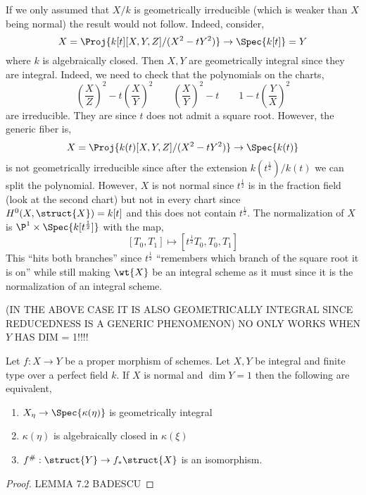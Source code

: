\documentclass[12pt]{article}
\begin{document}
\begin{rmk}
If we only assumed that $X / k$ is geometrically irreducible (which is weaker than $X$ being normal) the result would not follow. Indeed, consider,
\[ X = \Proj{k[t][X,Y,Z]/(X^2 - t Y^2)} \to \Spec{k[t]} = Y \]
where $k$ is algebraically closed. Then $X, Y$ are geometrically integral since they are integral. Indeed, we need to check that the polynomials on the charts,
\[ \left( \frac{X}{Z} \right)^2 - t \left( \frac{X}{Y} \right)^2 \quad \quad \left( \frac{X}{Y} \right)^2 - t \quad \quad 1 - t \left( \frac{Y}{X} \right)^2 \]
are irreducible. They are since $t$ does not admit a square root. However, the generic fiber is,
\[ X = \Proj{k(t)[X,Y,Z]/(X^2 - t Y^2)} \to \Spec{k(t)} \]
is not geometrically irreducible since after the extension $k(t^{\frac{1}{2}}) / k(t)$ we can split the polynomial. However, $X$ is not normal since $t^{\frac{1}{2}}$ is in the fraction field (look at the second chart) but not in every chart since $H^0(X, \struct{X}) = k[t]$ and this does not contain $t^{\frac{1}{2}}$. The normalization of $X$ is $\P^1 \times \Spec{k[t^{\frac{1}{2}}]}$ with the map,
\[ [T_0, T_1] \mapsto [t^{\frac{1}{2}} T_0, T_0, T_1] \]
This ``hits both branches'' since $t^{\frac{1}{2}}$ ``remembers which branch of the square root it is on'' while still making $\wt{X}$ be an integral scheme as it must since it is the normalization of an integral scheme.
\end{rmk}


(IN THE ABOVE CASE IT IS ALSO GEOMETRICALLY INTEGRAL SINCE REDUCEDNESS IS A GENERIC PHENOMENON) NO ONLY WORKS WHEN $Y$ HAS DIM = 1!!!!

\begin{prop}
Let $f : X \to Y$ be a proper morphism of schemes. Let $X, Y$ be integral and finite type over a perfect field $k$. If $X$ is normal and $\dim{Y} = 1$ then the following are equivalent,
\begin{enumerate}
\item $X_{\eta} \to \Spec{\kappa(\eta)}$ is geometrically integral

\item $\kappa(\eta)$ is algebraically closed in $\kappa(\xi)$

\item $f^{\#} : \struct{Y} \to f_* \struct{X}$ is an isomorphism.
\end{enumerate}
\end{prop}

\begin{proof}
LEMMA 7.2 BADESCU
\end{proof}
\end{document}
